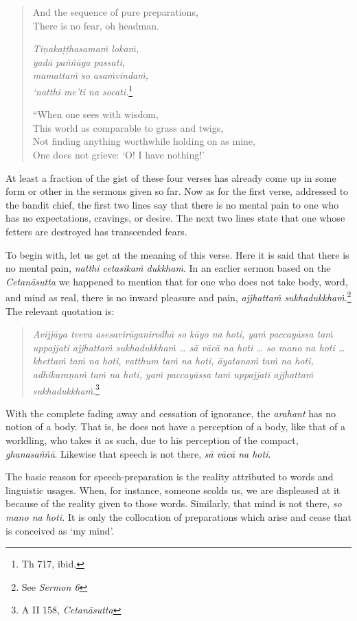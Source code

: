 \begin{quote}
And the sequence of pure preparations,\\
There is no fear, oh headman.

\emph{Tiṇakaṭṭhasamaṁ lokaṁ,}\\
\emph{yadā paññāya passati,}\\
\emph{mamattaṁ so asaṁvindaṁ,}\\
\emph{`natthi me'ti na socati.}\footnote{Th 717, ibid.}

``When one sees with wisdom,\\
This world as comparable to grass and twigs,\\
Not finding anything worthwhile holding on as mine,\\
One does not grieve: `O! I have nothing!'
\end{quote}

At least a fraction of the gist of these four verses has already come up in some form or other in the sermons given so far. Now as for the first verse, addressed to the bandit chief, the first two lines say that there is no mental pain to one who has no expectations, cravings, or desire. The next two lines state that one whose fetters are destroyed has transcended fears.

To begin with, let us get at the meaning of this verse. Here it is said that there is no mental pain, \emph{natthi cetasikaṁ dukkhaṁ}. In an earlier sermon based on the \emph{Cetanāsutta} we happened to mention that for one who does not take body, word, and mind as real, there is no inward pleasure and pain, \emph{ajjhattaṁ sukhadukkhaṁ}.\footnote{See \emph{Sermon 6}} The relevant quotation is:

\begin{quote}
\emph{Avijjāya tveva asesavirāganirodhā so kāyo na hoti, yaṁ paccayāssa taṁ uppajjati ajjhattaṁ sukhadukkhaṁ \ldots{} sā vācā na hoti \ldots{} so mano na hoti \ldots{} khettaṁ taṁ na hoti, vatthum taṁ na hoti, āyatanaṁ taṁ na hoti, adhikaraṇaṁ taṁ na hoti, yaṁ paccayāssa taṁ uppajjati ajjhattaṁ sukhadukkhaṁ}.\footnote{A II 158, \emph{Cetanāsutta}}
\end{quote}

With the complete fading away and cessation of ignorance, the \emph{arahant} has no notion of a body. That is, he does not have a perception of a body, like that of a worldling, who takes it as such, due to his perception of the compact, \emph{ghanasaññā}. Likewise that speech is not there, \emph{sā vācā na hoti}.

The basic reason for speech-preparation is the reality attributed to words and linguistic usages. When, for instance, someone scolds us, we are displeased at it because of the reality given to those words. Similarly, that mind is not there, \emph{so mano na hoti.} It is only the collocation of preparations which arise and cease that is conceived as `my mind'.

